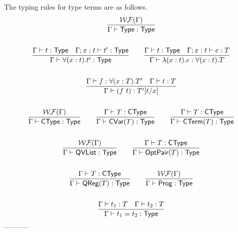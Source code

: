The typing rules for type terms are as follows.
\begin{gather*}
    \frac{\mathcal{WF}(\Gamma)}{\Gamma \vdash \textsf{Type} : \textsf{Type}} \\
    \\
    \frac{\Gamma \vdash t : \textsf{Type} \quad \Gamma; x:t \vdash t' : \textsf{Type}}{\Gamma \vdash \forall (x:t). t' : \textsf{Type}}
    \qquad
    \frac{\Gamma \vdash t : \textsf{Type} \quad \Gamma; x:t \vdash e : T}{\Gamma \vdash \lambda (x:t). e : \forall (x:t). T} \\
    \\
    \frac{\Gamma \vdash f : \forall (x : T). T' \quad \Gamma \vdash t : T}{\Gamma \vdash (f\ t) : T'[t/x]}\\
    \\
    \frac{\mathcal{WF}(\Gamma)}{\Gamma \vdash \textsf{CType} : \textsf{Type}}
    \qquad
    \frac{\Gamma \vdash T : \textsf{CType}}{\Gamma \vdash \textsf{CVar}(T) : \textsf{Type}}
    \qquad
    \frac{\Gamma \vdash T : \textsf{CType}}{\Gamma \vdash \textsf{CTerm}(T) : \textsf{Type} }
    \\
    \\
    \frac{\mathcal{WF}(\Gamma)}{\Gamma \vdash \textsf{QVList} : \textsf{Type}}
    \qquad
    \frac{\Gamma \vdash T : \textsf{CType}}{\Gamma \vdash \textsf{OptPair}(T) : \textsf{Type}}\\
    \\
    \frac{\Gamma \vdash T : \textsf{CType}}{\Gamma \vdash \textsf{QReg}(T) : \textsf{Type}}
    \qquad
    \frac{\mathcal{WF}(\Gamma)}{\Gamma \vdash \textsf{Prog} : \textsf{Type}} \\
    \\
    \frac{\Gamma \vdash t_1 : T \quad \Gamma \vdash t_2 : T}{\Gamma \vdash t_1 = t_2 : \textsf{Type}}
\end{gather*}
-----------
